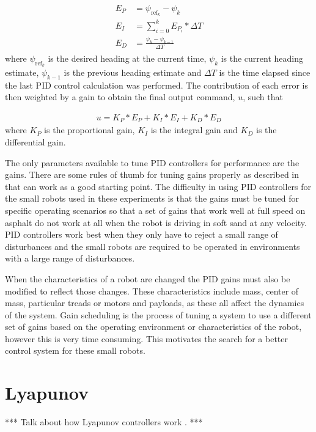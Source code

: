 \begin{align}
\label{eq:piderrors}
\begin{split}
E_P &= \psi_{\text{ref}_k} - \psi_k \\
E_I &= \sum_{i=0}^{k}E_{P_i}*\Delta T \\
E_D &= \frac{\psi_k - \psi_{k-1}}{\Delta T}
\end{split}
\end{align}
where $\psi_{\text{ref}_k}$ is the desired heading at the current time, $\psi_k$ is the current heading estimate, $\psi_{k-1}$ is the previous heading estimate and $\Delta T$ is the time elapsed since the last PID control calculation was performed. The contribution of each error is then weighted by a gain to obtain the final output command, $u$, such that

\begin{align}
\label{eq:pidcommand}
u = K_P*E_P + K_I*E_I + K_D*E_D
\end{align}
where $K_P$ is the proportional gain, $K_I$ is the integral gain and $K_D$ is the differential gain.

The only parameters available to tune PID controllers for performance are the gains. There are some rules of thumb for tuning gains properly as described in \cite{ZeiglerNichols42} that can work as a good starting point. The difficulty in using PID controllers for the small robots used in these experiments is that the gains must be tuned for specific operating scenarios so that a set of gains that work well at full speed on asphalt do not work at all when the robot is driving in soft sand at any velocity. PID controllers work best when they only have to reject a small range of disturbances and the small robots are required to be operated in environments with a large range of disturbances.

When the characteristics of a robot are changed the PID gains must also be modified to reflect those changes. These characteristics include mass, center of mass, particular treads or motors and payloads, as these all affect the dynamics of the system. Gain scheduling is the process of tuning a system to use a different set of gains based on the operating environment or characteristics of the robot, however this is very time consuming. This motivates the search for a better control system for these small robots.

\section{Lyapunov}
\label{sec:lyapunov}
*** Talk about how Lyapunov controllers work \cite{Khalil02}. ***

